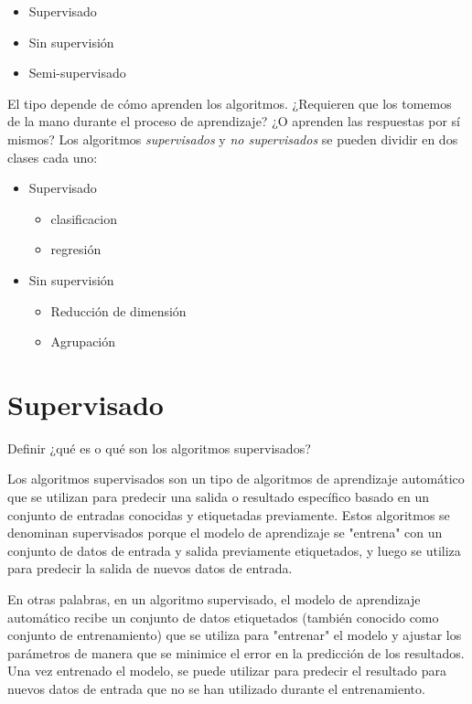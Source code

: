 \documentclass[12pt]{article}
\begin{document}
\begin{itemize}
\item Supervisado
\item Sin supervisión
\item Semi-supervisado
\end{itemize}



El tipo depende de cómo aprenden los algoritmos. ¿Requieren que los tomemos de la mano durante el proceso de aprendizaje? ¿O aprenden las respuestas por sí mismos? Los algoritmos \textit{supervisados} y \textit{no supervisados} se pueden dividir en dos clases cada uno:

\begin{itemize}
    \item Supervisado
    \begin{itemize}
        \item clasificacion
        \item regresión
    \end{itemize}
    \item Sin supervisión
    \begin{itemize}
        \item Reducción de dimensión
        \item Agrupación
    \end{itemize}
\end{itemize}







\section*{Supervisado}
Definir ¿qué es o qué son los algoritmos supervisados?

Los algoritmos supervisados son un tipo de algoritmos de aprendizaje automático que se utilizan para 
predecir una salida o resultado específico basado en un conjunto de entradas conocidas y etiquetadas previamente. 
Estos algoritmos se denominan supervisados porque el modelo de aprendizaje se "entrena" con un conjunto de datos 
de entrada y salida previamente etiquetados, y luego se utiliza para predecir la salida de nuevos datos de entrada.

En otras palabras, en un algoritmo supervisado, el modelo de aprendizaje automático recibe un conjunto de datos
etiquetados (también conocido como conjunto de entrenamiento) que se utiliza para "entrenar" 
el modelo y ajustar los parámetros de manera que se minimice el error en la predicción de los resultados. 
Una vez entrenado el modelo, se puede utilizar para predecir el resultado para nuevos datos de entrada que 
no se han utilizado durante el entrenamiento.
\end{document}
